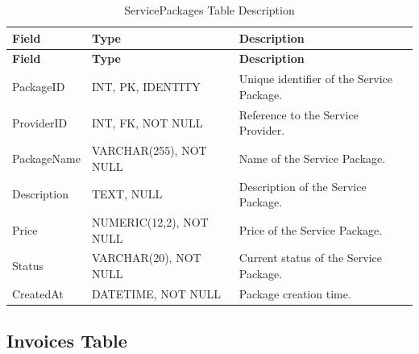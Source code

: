 \begin{longtable}{
		|>{\raggedright\arraybackslash}p{3.2cm}|
		>{\raggedright\arraybackslash}p{4.2cm}|
		>{\raggedright\arraybackslash}p{5.0cm}|
	}
	\caption{ServicePackages Table Description}
	\label{tab:service-packages}\\
	\hline
	\textbf{Field} & \textbf{Type} & \textbf{Description} \\ \hline
	\endfirsthead
	\hline
	\textbf{Field} & \textbf{Type} & \textbf{Description} \\ \hline
	\endhead
	
	PackageID & INT, PK, IDENTITY &
	Unique identifier of the Service Package. \\ \hline
	
	ProviderID & INT, FK, NOT NULL &
	Reference to the Service Provider. \\ \hline
	
	PackageName & VARCHAR(255), NOT NULL &
	Name of the Service Package. \\ \hline
	
	Description & TEXT, NULL &
	Description of the Service Package. \\ \hline
	
	Price & NUMERIC(12,2), NOT NULL &
	Price of the Service Package. \\ \hline
	
	Status & VARCHAR(20), NOT NULL &
	Current status of the Service Package. \\ \hline
	
	CreatedAt & DATETIME, NOT NULL &
	Package creation time. \\ \hline
	
\end{longtable}


\subsection{Invoices Table}

